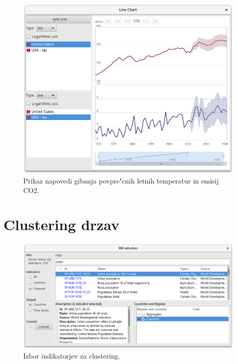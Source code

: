 \begin{figure}
\begin{center}
\includegraphics[width=12cm]{pic/var_forecast_graph.png}
\end{center}
\caption{Prikaz napovedi gibanja povpre"cnih letnih temperatur in emisij CO2.}
\label{co2_temp_forecast}
\end{figure} 




\section{Clustering drzav }



\begin{figure}
\begin{center}
\includegraphics[width=12cm]{pic/cluster_indicators.png}
\end{center}
\caption{Izbor indikatorjev za clustering.}
\label{cluster_indicators}
\end{figure} 

